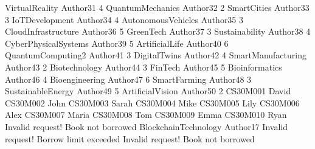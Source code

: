 VirtualReality Author31 4
QuantumMechanics Author32 2
SmartCities Author33 3
IoTDevelopment Author34 4
AutonomousVehicles Author35 3
CloudInfrastructure Author36 5
GreenTech Author37 3
Sustainability Author38 4
CyberPhysicalSystems Author39 5
ArtificialLife Author40 6
QuantumComputing2 Author41 3
DigitalTwins Author42 4
SmartManufacturing Author43 2
Biotechnology Author44 3
FinTech Author45 5
Bioinformatics Author46 4
Bioengineering Author47 6
SmartFarming Author48 3
SustainableEnergy Author49 5
ArtificialVision Author50 2
CS30M001 David
CS30M002 John
CS30M003 Sarah
CS30M004 Mike
CS30M005 Lily
CS30M006 Alex
CS30M007 Maria
CS30M008 Tom
CS30M009 Emma
CS30M010 Ryan
Invalid request! Book not borrowed
BlockchainTechnology Author17
Invalid request! Borrow limit exceeded
Invalid request! Book not borrowed